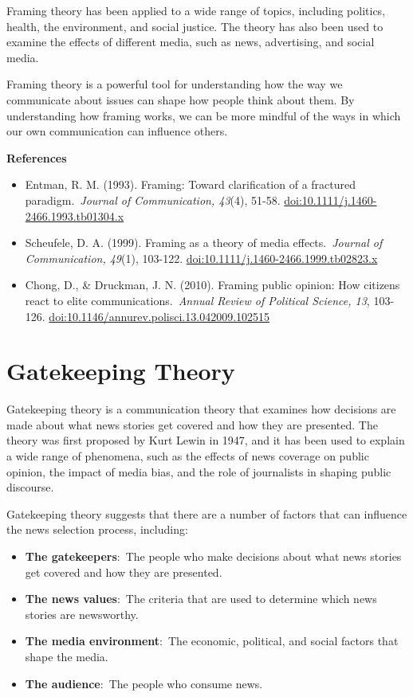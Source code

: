 \documentclass[
  b5paper]{book}
\begin{document}
Framing theory has been applied to a wide range of topics, including politics, health, the environment, and social justice. The theory has also been used to examine the effects of different media, such as news, advertising, and social media.

Framing theory is a powerful tool for understanding how the way we communicate about issues can shape how people think about them. By understanding how framing works, we can be more mindful of the ways in which our own communication can influence others.

\textbf{References}

\begin{itemize}
\item
  Entman, R. M. (1993). Framing: Toward clarification of a fractured paradigm.~\emph{Journal of Communication, 43}(4), 51-58. \url{doi:10.1111/j.1460-2466.1993.tb01304.x}
\item
  Scheufele, D. A. (1999). Framing as a theory of media effects.~\emph{Journal of Communication, 49}(1), 103-122. \url{doi:10.1111/j.1460-2466.1999.tb02823.x}
\item
  Chong, D., \& Druckman, J. N. (2010). Framing public opinion: How citizens react to elite communications.~\emph{Annual Review of Political Science, 13}, 103-126. \url{doi:10.1146/annurev.polisci.13.042009.102515}
\end{itemize}

\hypertarget{gatekeeping-theory}{%
\section{Gatekeeping Theory}\label{gatekeeping-theory}}

Gatekeeping theory is a communication theory that examines how decisions are made about what news stories get covered and how they are presented. The theory was first proposed by Kurt Lewin in 1947, and it has been used to explain a wide range of phenomena, such as the effects of news coverage on public opinion, the impact of media bias, and the role of journalists in shaping public discourse.

Gatekeeping theory suggests that there are a number of factors that can influence the news selection process, including:

\begin{itemize}
\item
  \textbf{The gatekeepers}:~The people who make decisions about what news stories get covered and how they are presented.
\item
  \textbf{The news values}:~The criteria that are used to determine which news stories are newsworthy.
\item
  \textbf{The media environment}:~The economic, political, and social factors that shape the media.
\item
  \textbf{The audience}:~The people who consume news.
\end{itemize}
\end{document}
